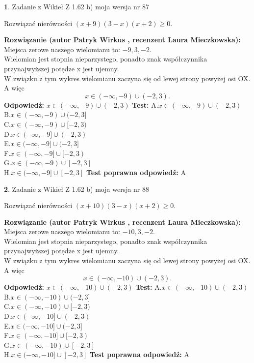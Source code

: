 \documentclass[12pt, a4paper]{article}
\theoremstyle{definition} %
\newtheorem{zad}{}
\newcommand{\zadStart}[1]{\begin{zad}#1\newline}
\newcommand{\zadStop}{\end{zad}}
\newcommand{\rozwStart}[2]{\noindent \textbf{Rozwiązanie (autor #1 , recenzent #2): }\newline}
\newcommand{\rozwStop}{\newline}
\newcommand{\odpStart}{\noindent \textbf{Odpowiedź:}\newline}
\newcommand{\odpStop}{\newline}
\newcommand{\testStart}{\noindent \textbf{Test:}\newline}
\newcommand{\testStop}{\newline}
\newcommand{\kluczStart}{\noindent \textbf{Test poprawna odpowiedź:}\newline}
\newcommand{\kluczStop}{\newline}
\begin{document}
\zadStart{Zadanie z Wikieł Z 1.62 b) moja wersja nr 87}

Rozwiązać nierówności $(x+9)(3-x)(x+2)\ge0$.
\zadStop
\rozwStart{Patryk Wirkus}{Laura Mieczkowska}
Miejsca zerowe naszego wielomianu to: $-9, 3, -2$.\\
Wielomian jest stopnia nieparzystego, ponadto znak współczynnika przy\linebreak najwyższej potędze x jest ujemny.\\ W związku z tym wykres wielomianu zaczyna się od lewej strony powyżej osi OX. A więc $$x \in (-\infty,-9) \cup (-2,3).$$
\rozwStop
\odpStart
$x \in (-\infty,-9) \cup (-2,3)$
\odpStop
\testStart
A.$x \in (-\infty,-9) \cup (-2,3)$\\
B.$x \in (-\infty,-9) \cup (-2,3]$\\
C.$x \in (-\infty,-9) \cup [-2,3)$\\
D.$x \in (-\infty,-9] \cup (-2,3)$\\
E.$x \in (-\infty,-9] \cup (-2,3]$\\
F.$x \in (-\infty,-9] \cup [-2,3)$\\
G.$x \in (-\infty,-9) \cup [-2,3]$\\
H.$x \in (-\infty,-9] \cup [-2,3]$
\testStop
\kluczStart
A
\kluczStop



\zadStart{Zadanie z Wikieł Z 1.62 b) moja wersja nr 88}

Rozwiązać nierówności $(x+10)(3-x)(x+2)\ge0$.
\zadStop
\rozwStart{Patryk Wirkus}{Laura Mieczkowska}
Miejsca zerowe naszego wielomianu to: $-10, 3, -2$.\\
Wielomian jest stopnia nieparzystego, ponadto znak współczynnika przy\linebreak najwyższej potędze x jest ujemny.\\ W związku z tym wykres wielomianu zaczyna się od lewej strony powyżej osi OX. A więc $$x \in (-\infty,-10) \cup (-2,3).$$
\rozwStop
\odpStart
$x \in (-\infty,-10) \cup (-2,3)$
\odpStop
\testStart
A.$x \in (-\infty,-10) \cup (-2,3)$\\
B.$x \in (-\infty,-10) \cup (-2,3]$\\
C.$x \in (-\infty,-10) \cup [-2,3)$\\
D.$x \in (-\infty,-10] \cup (-2,3)$\\
E.$x \in (-\infty,-10] \cup (-2,3]$\\
F.$x \in (-\infty,-10] \cup [-2,3)$\\
G.$x \in (-\infty,-10) \cup [-2,3]$\\
H.$x \in (-\infty,-10] \cup [-2,3]$
\testStop
\kluczStart
A
\kluczStop
\end{document}
